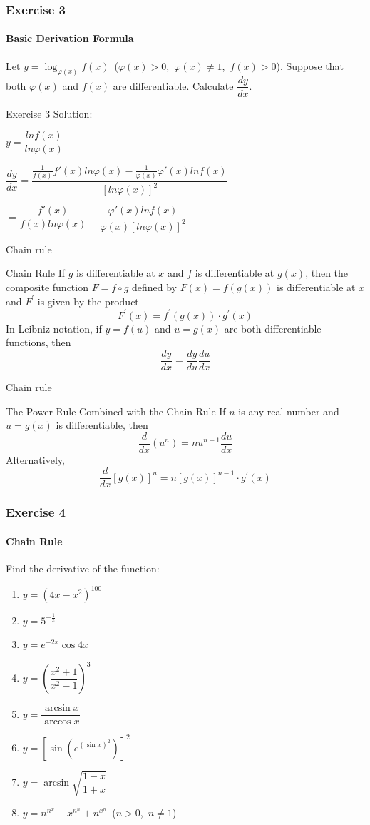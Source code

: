 \documentclass{beamer}
\begin{document}
\begin{frame}
		\frametitle{Exercise 3}
		\framesubtitle{Basic Derivation Formula}
		Let $y = \log_{\varphi (x)}{f(x)}$\ ($\varphi (x) > 0$,\ $\varphi (x) \neq 1$,\ $f(x) > 0$). Suppose that both $\varphi (x)$ and $f(x)$ are differentiable. Calculate $\dfrac{dy}{dx}$.
	\end{frame}

\begin{frame}{Exercise 3}
Solution:

$y = \dfrac{lnf(x)}{ln\varphi(x)}$

$\dfrac{dy}{dx} = \dfrac{\frac{1}{f(x)}f'(x)ln\varphi(x) - \frac{1}{\varphi(x)}\varphi'(x)lnf(x)}{[ln\varphi(x)]^2}$

$=\dfrac{f'(x)}{f(x)ln\varphi(x)} - \dfrac{\varphi'(x)lnf(x)}{\varphi(x)[ln\varphi(x)]^2}$

\end{frame}


\begin{frame}{Chain rule}
    \begin{block}{Chain Rule}
    If $g$ is differentiable at $x$ and $f$ is differentiable at $g(x)$, then the composite function $F=f \circ g$ defined by $F(x)=f(g(x))$ is differentiable at $x$ and $F^{\prime}$ is given by the product
    $$
    F^{\prime}(x)=f^{\prime}(g(x)) \cdot g^{\prime}(x)
    $$
    In Leibniz notation, if $y=f(u)$ and $u=g(x)$ are both differentiable functions, then
    $$
    \frac{d y}{d x}=\frac{d y}{d u} \frac{d u}{d x}
    $$
    \end{block}
\end{frame}

\begin{frame}{Chain rule}
    \begin{block}{The Power Rule Combined with the Chain Rule }
    If $n$ is any real number and $u=g(x)$ is differentiable, then
    $$
    \frac{d}{d x}\left(u^{n}\right)=n u^{n-1} \frac{d u}{d x}
    $$
    Alternatively,
    $$
    \frac{d}{d x}[g(x)]^{n}=n[g(x)]^{n-1} \cdot g^{\prime}(x)
    $$
    \end{block}
\end{frame}
\begin{frame}
		\frametitle{Exercise 4}
		\framesubtitle{Chain Rule}
		Find the derivative of the function:
		\begin{enumerate}
			\item $y = (4x - x^{2})^{100}$
			\item $y = 5^{-\frac{1}{x}}$
			\item $y = e^{-2x}\cos{4x}$
			\item $y = (\dfrac{x^{2}+1}{x^{2}-1})^{3}$
			\item $y = \dfrac{\arcsin{x}}{\arccos{x}}$
			\item $y = [\sin{(e^{(\sin{x})^{2}})}]^{2}$
			\item $y = \arcsin{\sqrt{\dfrac{1 - x}{1 + x}}}$
			\item $y = n^{n^{x}} + x^{n^{n}} + n^{x^{n}}$\ ($n > 0$,\ $n \neq 1$)
		\end{enumerate}
	\end{frame}
	
\end{document}
